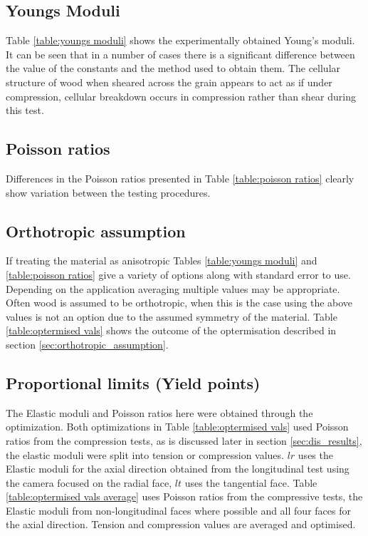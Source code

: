 \documentclass[10pt]{article}
\begin{document}
\subsection{Youngs Moduli}
Table \ref{table:youngs moduli} shows the experimentally obtained Young's moduli. It can be seen that in a number of cases there is a significant difference between the value of the constants and the method used to obtain them. The cellular structure of wood when sheared across the grain appears to act as if under compression, cellular breakdown occurs in compression rather than shear during this test.

\subsection{Poisson ratios}
Differences in the Poisson ratios presented in Table \ref{table:poisson ratios} clearly show variation between the testing procedures.

\subsection{Orthotropic assumption}
If treating the material as anisotropic Tables \ref{table:youngs moduli} and \ref{table:poisson ratios} give a variety of options along with standard error to use. Depending on the application averaging multiple values may be appropriate. Often wood is assumed to be orthotropic, when this is the case using the above values is not an option due to the assumed symmetry of the material. Table \ref{table:optermised vals} shows the outcome of the optermisation described in section \ref{sec:orthotropic_assumption}.

\subsection{Proportional limits (Yield points)}
The Elastic moduli and Poisson ratios here were obtained through the optimization. Both optimizations in Table \ref{table:optermised vals} used Poisson ratios from the compression tests, as is discussed later in section \ref{sec:dis_results}, the elastic moduli were split into tension or compression values. \(lr\) uses the Elastic moduli for the axial direction obtained from the longitudinal test using the camera focused on the radial face, \(lt\) uses the tangential face.
Table \ref{table:optermised vals average} uses Poisson ratios from the compressive tests, the Elastic moduli from non-longitudinal faces where possible and all four faces for the axial direction. Tension and compression values are averaged and optimised.
\end{document}
